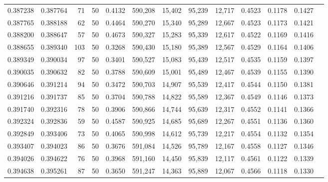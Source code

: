 \begin{tabular}{rrrrrrrrrrrrr}
0.387238 & 0.387764 &    71 &  50 &                                     0.4132 & 590,208 &  15,402 &  95,239 &  12,717 & 0.4523 & 0.1178 & 0.1427 \\
0.387765 & 0.388188 &    62 &  50 &                                     0.4464 & 590,270 &  15,340 &  95,289 &  12,667 & 0.4523 & 0.1173 & 0.1421 \\
0.388200 & 0.388647 &    57 &  50 &                                     0.4673 & 590,327 &  15,283 &  95,339 &  12,617 & 0.4522 & 0.1169 & 0.1416 \\
0.388655 & 0.389340 &   103 &  50 &                                     0.3268 & 590,430 &  15,180 &  95,389 &  12,567 & 0.4529 & 0.1164 & 0.1406 \\
0.389349 & 0.390034 &    97 &  50 &                                     0.3401 & 590,527 &  15,083 &  95,439 &  12,517 & 0.4535 & 0.1159 & 0.1397 \\
0.390035 & 0.390632 &    82 &  50 &                                     0.3788 & 590,609 &  15,001 &  95,489 &  12,467 & 0.4539 & 0.1155 & 0.1390 \\
0.390646 & 0.391214 &    94 &  50 &                                     0.3472 & 590,703 &  14,907 &  95,539 &  12,417 & 0.4544 & 0.1150 & 0.1381 \\
0.391216 & 0.391737 &    85 &  50 &                                     0.3704 & 590,788 &  14,822 &  95,589 &  12,367 & 0.4549 & 0.1146 & 0.1373 \\
0.391740 & 0.392316 &    78 &  50 &                                     0.3906 & 590,866 &  14,744 &  95,639 &  12,317 & 0.4552 & 0.1141 & 0.1366 \\
0.392324 & 0.392836 &    59 &  50 &                                     0.4587 & 590,925 &  14,685 &  95,689 &  12,267 & 0.4551 & 0.1136 & 0.1360 \\
0.392849 & 0.393406 &    73 &  50 &                                     0.4065 & 590,998 &  14,612 &  95,739 &  12,217 & 0.4554 & 0.1132 & 0.1354 \\
0.393407 & 0.394023 &    86 &  50 &                                     0.3676 & 591,084 &  14,526 &  95,789 &  12,167 & 0.4558 & 0.1127 & 0.1346 \\
0.394026 & 0.394622 &    76 &  50 &                                     0.3968 & 591,160 &  14,450 &  95,839 &  12,117 & 0.4561 & 0.1122 & 0.1339 \\
0.394638 & 0.395261 &    87 &  50 &                                     0.3650 & 591,247 &  14,363 &  95,889 &  12,067 & 0.4566 & 0.1118 & 0.1330 \\

\end{tabular}
